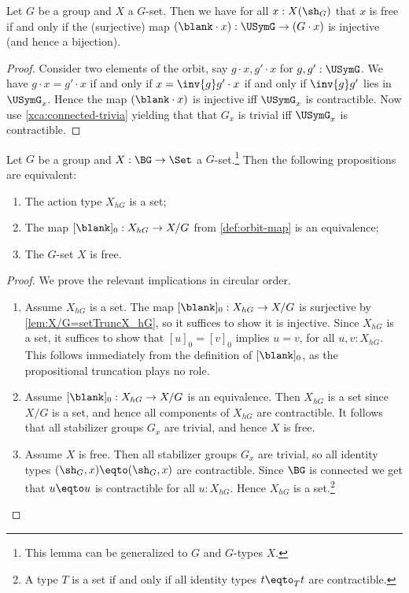 \begin{lemma}\label{lem:free-pt-char}
  Let $G$ be a group and $X$ a $G$-set. Then we have for all $x:X(\sh_G)$
  that $x$ is free if and only if the (surjective) map
  $(\blank \cdot x) : \USymG \to (G\cdot x)$ is injective
  (and hence a bijection).
\end{lemma}
\begin{proof}
  Consider two elements of the orbit, say $g\cdot x,g'\cdot x$ for $g,g':\USymG$.
  We have $g\cdot x=g' \cdot x$ if and only if $x = \inv{g} g'\cdot x$
  if and only if $\inv{g} g'$ lies in $\USymG_x$.
  Hence the map $(\blank \cdot x)$ is injective iff $\USymG_x$ is contractible.
  Now use \cref{xca:connected-trivia} yielding that that 
  $G_x$ is trivial iff $\USymG_x$ is contractible.
\end{proof}

\begin{lemma}\label{lem:X_hG-set-iff-Xfree}
Let $G$ be a group and $X:\BG\to\Set$ a $G$-set.\footnote{%
This lemma can be generalized to \inftygps $G$ and $G$-types $X$.}
Then the following propositions are equivalent:
\begin{enumerate}
\item The action type $X_{hG}$ is a set;
\item The map $[\blank]_0 :X_{hG}\to X/G$ from 
      \cref{def:orbit-map} is an equivalence;
\item The $G$-set $X$ is free.
\end{enumerate}
\end{lemma}
\begin{proof}
We prove the relevant implications in circular order.
\begin{enumerate}
\item Assume $X_{hG}$ is a set. The map  $[\blank]_0 :X_{hG}\to X/G$ is
surjective by \cref{lem:X/G=setTruncX_hG}, so it suffices to show
it is injective. Since $X_{hG}$ is a set, it suffices to
show that $[u]_0=[v]_0$ implies $u=v$, for all $u,v:X_{hG}$.
This follows immediately from the definition of $[\blank]_0$, 
as the propositional truncation plays no role.
\item Assume $[\blank]_0 :X_{hG}\to X/G$ is an equivalence.
Then $X_{hG}$ is a set since $X/G$ is a set, and hence
all components of $X_{hG}$ are contractible.
It follows that all stabilizer groups $G_x$ are trivial,
and hence $X$ is free.
\item Assume $X$ is free. Then all stabilizer groups $G_x$ are trivial,
so all identity types $(\sh_G,x)\eqto (\sh_G,x)$ are contractible.
Since $\BG$ is connected we get that $u\eqto u$ is contractible
for all $u:X_{hG}$. Hence $X_{hG}$ is a set.\footnote{%
A type $T$ is a set 
if and only if all identity types $t\eqto_T t$ are contractible.}\qedhere
\end{enumerate}
\end{proof}

